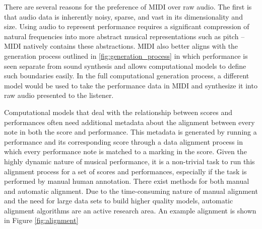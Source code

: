 There are several reasons for the preference of MIDI over raw audio. The first is that audio data is inherently noisy, sparse, and vast in its dimensionality and size. Using audio to represent performance requires a significant compression of natural frequencies into more abstract musical representations such as pitch -- MIDI natively contains these abstractions. MIDI also better aligns with the generation process outlined in \ref{fig:generation_process} in which performance is seen separate from sound synthesis and allows computational models to define such boundaries easily. In the full computational generation process, a different model would be used to take the performance data in MIDI and synthesize it into raw audio presented to the listener. 

Computational models that deal with the relationship between scores and performances often need additional metadata about the alignment between every note in both the score and performance. This metadata is generated by running a performance and its corresponding score through a data alignment process in which every performance note is matched to a marking in the score. Given the highly dynamic nature of musical performance, it is a non-trivial task to run this alignment process for a set of scores and performances, especially if the task is performed by manual human annotation. There exist methods for both manual and automatic alignment. Due to the time-consuming nature of manual alignment and the need for large data sets to build higher quality models, automatic alignment algorithms are an active research area. An example alignment is shown in Figure \ref{fig:alignment}

